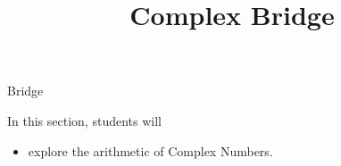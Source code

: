 \documentclass{ximera}
\title{Complex Bridge}
\begin{document}
\begin{abstract}
\end{abstract}
\maketitle




Bridge







\begin{sectionOutcomes}
In this section, students will 

\begin{itemize}
\item explore the arithmetic of Complex Numbers.
\end{itemize}
\end{sectionOutcomes}
\end{document}
